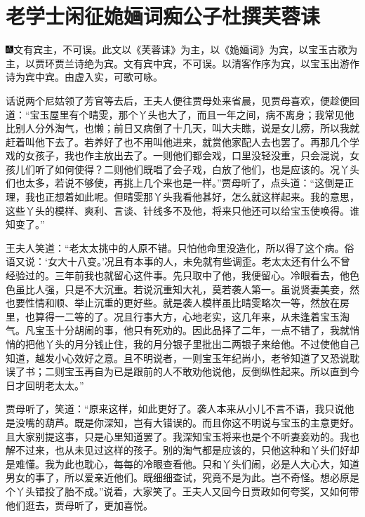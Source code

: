 
\chapter{老学士闲征姽婳词\hspace{.5em}痴公子杜撰芙蓉诔}
{\includegraphics[width=3mm]{../Images/00005}\kaishu 文有宾主，不可误。此文以《芙蓉诔》为主，以《姽婳词》为宾，以宝玉古歌为主，以贾环贾兰诗绝为宾。文有宾中宾，不可误。以清客作序为宾，以宝玉出游作诗为宾中宾。由虚入实，可歌可咏。}

话说两个尼姑领了芳官等去后，王夫人便往贾母处来省晨，见贾母喜欢，便趁便回道：“宝玉屋里有个晴雯，那个丫头也大了，而且一年之间，病不离身；我常见他比别人分外淘气，也懒；前日又病倒了十几天，叫大夫瞧，说是女儿痨，所以我就赶着叫他下去了。若养好了也不用叫他进来，就赏他家配人去也罢了。再那几个学戏的女孩子，我也作主放出去了。一则他们都会戏，口里没轻没重，只会混说，女孩儿们听了如何使得？二则他们既唱了会子戏，白放了他们，也是应该的。况丫头们也太多，若说不够使，再挑上几个来也是一样。”贾母听了，点头道：“这倒是正理，我也正想着如此呢。但晴雯那丫头我看他甚好，怎么就这样起来。我的意思，这些丫头的模样、爽利、言谈、针线多不及他，将来只他还可以给宝玉使唤得。谁知变了。”

王夫人笑道：“老太太挑中的人原不错。只怕他命里没造化，所以得了这个病。俗语又说：‘女大十八变。’况且有本事的人，未免就有些调歪。老太太还有什么不曾经验过的。三年前我也就留心这件事。先只取中了他，我便留心。冷眼看去，他色色虽比人强，只是不大沉重。若说沉重知大礼，莫若袭人第一。虽说贤妻美妾，然也要性情和顺、举止沉重的更好些。就是袭人模样虽比晴雯略次一等，然放在房里，也算得一二等的了。况且行事大方，心地老实，这几年来，从未逢着宝玉淘气。凡宝玉十分胡闹的事，他只有死劝的。因此品择了二年，一点不错了，我就悄悄的把他丫头的月分钱止住，我的月分银子里批出二两银子来给他。不过使他自己知道，越发小心效好之意。且不明说者，一则宝玉年纪尚小，老爷知道了又恐说耽误了书；二则宝玉再自为已是跟前的人不敢劝他说他，反倒纵性起来。所以直到今日才回明老太太。”

贾母听了，笑道：“原来这样，如此更好了。袭人本来从小儿不言不语，我只说他是没嘴的葫芦。既是你深知，岂有大错误的。而且你这不明说与宝玉的主意更好。且大家别提这事，只是心里知道罢了。我深知宝玉将来也是个不听妻妾劝的。我也解不过来，也从未见过这样的孩子。别的淘气都是应该的，只他这种和丫头们好却是难懂。我为此也耽心，每每的冷眼查看他。只和丫头们闹，必是人大心大，知道男女的事了，所以爱亲近他们。既细细查试，究竟不是为此。岂不奇怪。想必原是个丫头错投了胎不成。”说着，大家笑了。王夫人又回今日贾政如何夸奖，又如何带他们逛去，贾母听了，更加喜悦。

